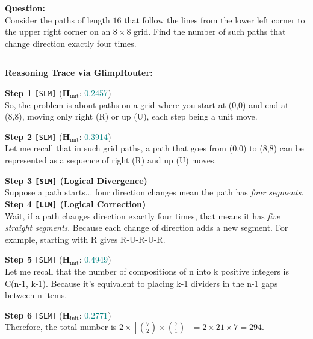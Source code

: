 \documentclass[11pt]{article}
\newcommand{\approach}{{GlimpRouter}\xspace}
\begin{document}
\begin{tcolorbox}[
    colback=white,
    colframe=gray!60,
    boxrule=0.8pt,
    arc=2mm,
    fonttitle=\bfseries,
    coltitle=black,
    title={A Case of the Self-correction Mechanism in LRMs}
]
\small

\textbf{Question:} \\
Consider the paths of length $16$ that follow the lines from the lower left corner to the upper right corner on an $8\times 8$ grid. Find the number of such paths that change direction exactly four times.

\vspace{0.2cm}
\hrule
\vspace{0.2cm}

\textbf{Reasoning Trace via \approach:}

\noindent \textbf{Step 1} \texttt{[SLM]} {\scriptsize ($\mathbf{H}_\text{init}$: \textcolor{teal}{0.2457})} \\
So, the problem is about paths on a grid where you start at (0,0) and end at (8,8), moving only right (R) or up (U), each step being a unit move.

\noindent \textbf{Step 2} \texttt{[SLM]} {\scriptsize ($\mathbf{H}_\text{init}$: \textcolor{teal}{0.3914})} \\
Let me recall that in such grid paths, a path that goes from (0,0) to (8,8) can be represented as a sequence of right (R) and up (U) moves.

\vspace{0.1cm}
\noindent \colorbox{red!10}{\parbox{\dimexpr\linewidth-6pt}{
\textbf{Step 3 \texttt{[SLM]} (Logical Divergence)} \\
Suppose a path starts... four direction changes mean the path has \textit{four segments}. \\
\textbf{Step 4 \texttt{[LLM]} (Logical Correction)} \\
Wait, if a path changes direction exactly four times, that means it has \textit{five straight segments}. Because each change of direction adds a new segment. For example, starting with R gives R-U-R-U-R.
}}
\vspace{0.1cm}

\noindent \textbf{Step 5} \texttt{[SLM]} {\scriptsize ($\mathbf{H}_\text{init}$: \textcolor{teal}{0.4949})} \\
Let me recall that the number of compositions of n into k positive integers is C(n-1, k-1). Because it's equivalent to placing k-1 dividers in the n-1 gaps between n items.

\noindent \textbf{Step 6} \texttt{[SLM]} {\scriptsize ($\mathbf{H}_\text{init}$: \textcolor{teal}{0.2771})} \\
Therefore, the total number is $2 \times [\binom{7}{2} \times \binom{7}{1}] = 2 \times 21 \times 7 = \boxed{294}$.

\end{tcolorbox}
\end{document}
